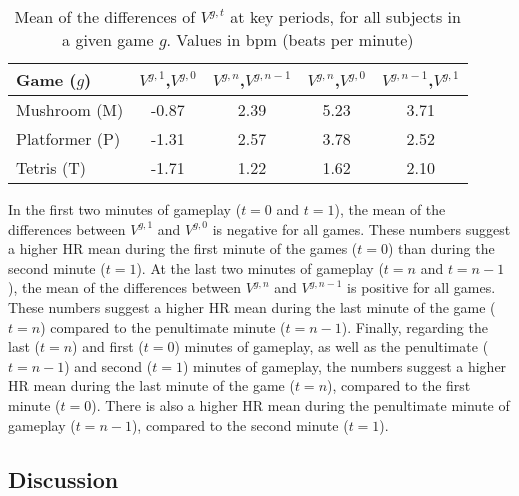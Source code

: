 \begin{table}
\caption{Mean of the differences of $V^{g,t}$ at key periods, for all subjects in a given game $g$. Values in bpm (beats per minute)}
\label{table:mean}
\centering
\begin{tabular}{p{.21\linewidth}cccc}
\toprule%
\textbf{Game ($g$)} & \textbf{$V^{g,1}$,$V^{g,0}$} & \textbf{$V^{g,n}$,$V^{g,n-1}$} & \textbf{$V^{g,n}$,$V^{g,0}$} & \textbf{$V^{g,n-1}$,$V^{g,1}$} \\
\midrule%
Mushroom (M) & -0.87   & 2.39 & 5.23 & 3.71 \\
Platformer (P) & -1.31   & 2.57 & 3.78  & 2.52  \\
Tetris (T) & -1.71 & 1.22  & 1.62    & 2.10 \\
\bottomrule%
\end{tabular}
\end{table}

In the first two minutes of gameplay ($t=0$ and $t=1$), the mean of the differences between $V^{g,1}$ and $V^{g,0}$ is negative for all games. These numbers suggest a higher HR mean during the first minute of the games ($t=0$) than during the second minute ($t=1$). At the last two minutes of gameplay ($t=n$ and $t=n-1$), the mean of the differences between $V^{g,n}$ and $V^{g,n-1}$ is positive for all games. These numbers suggest a higher HR mean during the last minute of the game ($t=n$) compared to the penultimate minute ($t=n-1$). Finally, regarding the last ($t=n$) and first ($t=0$) minutes of gameplay, as well as the penultimate ($t=n-1$) and second ($t=1$) minutes of gameplay, the numbers suggest a higher HR mean during the last minute of the game ($t=n$), compared to the first minute ($t=0$). There is also a higher HR mean during the penultimate minute of gameplay ($t=n-1$), compared to the second minute ($t=1$).

\subsection{Discussion}

